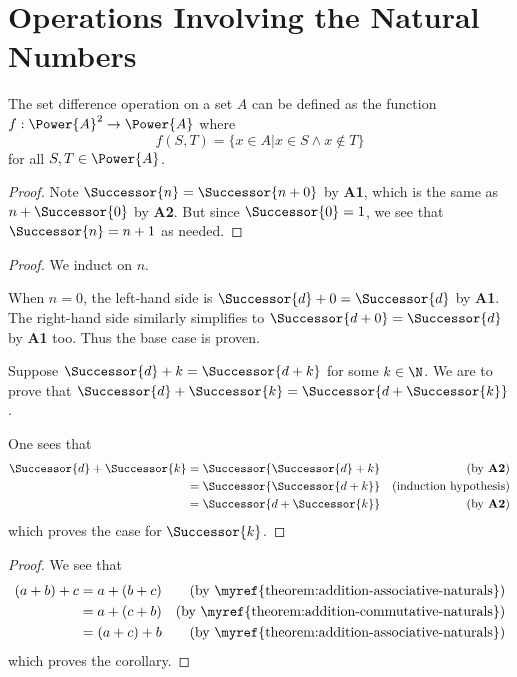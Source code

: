 \section{Operations Involving the Natural Numbers}
\begin{questions}
    \item The set difference operation on a set $A$ can be defined as the function $f: \Power{A}^2 \to \Power{A}$ where
    \[
        f(S, T) = \{x \in A \vert x \in S \land x \notin T\}
    \]
    for all $S, T \in \Power{A}$.

    \item \begin{proof}
        Note $\Successor{n} = \Successor{n + 0}$ by \textbf{A1}, which is the same as $n + \Successor{0}$ by \textbf{A2}. But since $\Successor{0} = 1$, we see that $\Successor{n} = n + 1$ as needed.
    \end{proof}

    \item \begin{proof}
        We induct on $n$.

        When $n = 0$, the left-hand side is $\Successor{d} + 0 = \Successor{d}$ by \textbf{A1}. The right-hand side similarly simplifies to $\Successor{d + 0} = \Successor{d}$ by \textbf{A1} too. Thus the base case is proven.

        Suppose $\Successor{d} + k = \Successor{d + k}$ for some $k \in \N$. We are to prove that $\Successor{d} + \Successor{k} = \Successor{d + \Successor{k}}$.

        One sees that
        \begin{align*}
            \Successor{d} + \Successor{k} &= \Successor{\Successor{d} + k} & (\text{by \textbf{A2}})\\
            &= \Successor{\Successor{d + k}} & (\text{induction hypothesis})\\
            &= \Successor{d + \Successor{k}} & (\text{by \textbf{A2}})
        \end{align*}
        which proves the case for $\Successor{k}$.
    \end{proof}

    \item \begin{proof}
        We see that
        \begin{align*}
            (a + b) + c &= a + (b + c) & (\text{by \myref{theorem:addition-associative-naturals}})\\
            &= a + (c + b) &  (\text{by \myref{theorem:addition-commutative-naturals}})\\
            &= (a + c) + b & (\text{by \myref{theorem:addition-associative-naturals}})
        \end{align*}
        which proves the corollary.
    \end{proof}


\end{questions}
